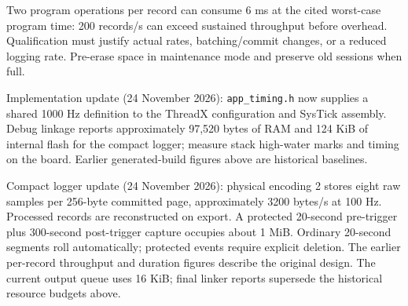 Two program operations per record can consume 6 ms at the cited worst-case program time: 200 records/s can exceed sustained throughput before overhead. Qualification must justify actual rates, batching/commit changes, or a reduced logging rate. Pre-erase space in maintenance mode and preserve old sessions when full.

Implementation update (24 November 2026): \texttt{app\_timing.h} now supplies a shared 1000 Hz definition to the ThreadX configuration and SysTick assembly. Debug linkage reports approximately 97,520 bytes of RAM and 124 KiB of internal flash for the compact logger; measure stack high-water marks and timing on the board. Earlier generated-build figures above are historical baselines.

Compact logger update (24 November 2026): physical encoding 2 stores eight raw samples per 256-byte committed page, approximately 3200 bytes/s at 100 Hz. Processed records are reconstructed on export. A protected 20-second pre-trigger plus 300-second post-trigger capture occupies about 1 MiB. Ordinary 20-second segments roll automatically; protected events require explicit deletion. The earlier per-record throughput and duration figures describe the original design. The current output queue uses 16 KiB; final linker reports supersede the historical resource budgets above.
